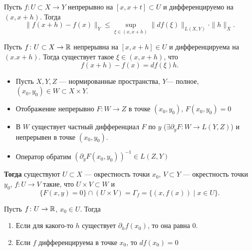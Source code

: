 \documentclass[10pt,dvipsnames]{report}
\begin{document}
\begin{thm}
    Пусть $ f \colon U \subset X \to  Y$ непрерывно на $ [x, x+t] \subset U$ и дифференцируемо на $ (x, x+h)$. Тогда
     \[
	 \| f(x+h) - f(x) \|_Y \le \sup_{\xi \in (x, x+h)} \| df(\xi) \|_{L(X, Y)} \cdot \| h \|_X 
    .\] 
\end{thm}


\begin{thm}
    Пусть $ f\colon U \subset X \to  \mathbb{R}$ непрерывна на $ [x, x+h] \in U$ и дифференцируема на $ (x. x+h)$. Тогда существует такое  $ \xi \in (x, x+h)$, что
    \[
	f(x+h) - f(x) = df(\xi )h
    .\] 
\end{thm}


\begin{thm} \label{thm:implicit-display}
    \begin{itemize}[noitemsep]
	\item Пусть $ X, Y, Z$ --- нормированные пространства,   $ Y$--- полное, $ (x_0, y_0) \in W \subset X \times Y$.
	\item Отображение непрерывно $ F \colon W \to  Z$ в точке $ (x_0, y_0)$, $ F(x_0, y_0) = 0$
	\item В $ W$ существует частный дифференциал  $ F$ по  $ y$ ($ \exists  \partial _y F \colon W \to  L(Y, Z)$) и непрерывен в точке $ (x_0, y_0)$.
	\item  Оператор обратим $ (\partial _yF(x_0, y_0) )^{-1} \in  L(Z, Y)$
    \end{itemize}
	{\bf Тогда} существуют $ U \subset X$ --- окрестность точки $ x_0$, $ V \subset Y$ --- окрестность точки $ y_0$, $ f\colon U \to  V$ такие, что $ U \times V \subset W$ и
    \[
	\{F(x, y) = 0\} \cap (U \times V) = \Gamma _f = \{(x, f(x)) \mid x \in U\}
    .\] 
\end{thm}


\begin{thm}
    Пусть $ f\colon U \to  \mathbb{R}$, $ x_0 \in U$. Тогда
    \begin{enumerate}[noitemsep]
	\item Если для какого-то $ h$ существует  $ \partial _h f(x_0)$, то она равна 0.
	\item Если $ f$ дифференцируема в точке  $ x_0$, то $ df(x_0) = 0$
    \end{enumerate}
\end{thm}
\end{document}
